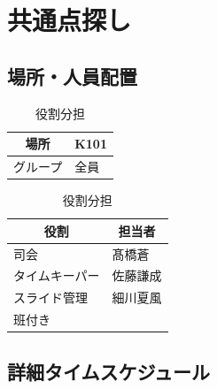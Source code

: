 \newpage
\section{共通点探し}  %

\subsection{場所・人員配置}
\begin{table}[h]
  \centering
  \begin{minipage}[t]{0.48\columnwidth}
    \centering
    \caption{場所・該当グループ}
    \begin{tabular}{cl}
      \hline
      場所 & K101 \\
      \hline
      グループ & 全員 \\
      \hline
    \end{tabular}
  \end{minipage}
  \begin{minipage}[t]{0.48\columnwidth}
    \centering
    \caption{役割分担}
    \begin{tabular}{ll}
      \hline
      \multicolumn{1}{c}{役割} & \multicolumn{1}{c}{担当者} \\
      \hline
      司会 & 髙橋蒼 \\
      タイムキーパー & 佐藤謙成 \\
      スライド管理 & 細川夏風 \\
      班付き &  \\
      \hline
    \end{tabular}
  \end{minipage}
\end{table}

\subsection{詳細タイムスケジュール}
\vspace{0.5em}
\fontsize{8pt}{12pt}\selectfont

